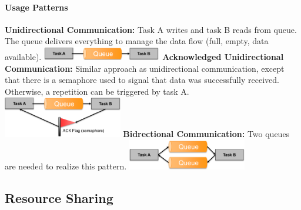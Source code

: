 \paragraph{Usage Patterns}
\begin{paracol}{2}
  \textbf{Unidirectional Communication:} Task A writes and task B reads from queue.
  The queue delivers everything to manage the data flow (full, empty, data available).
  \switchcolumn
  \includegraphics[width=0.39\textwidth]{images/Concurrency/uni_queue.png}
  \switchcolumn
  \textbf{Acknowledged Unidirectional Communication:}
  Similar approach as unidirectional communication, except that there is a semaphore used to signal that data was successfully received.
  Otherwise, a repetition can be triggered by task A.
  \switchcolumn
  \includegraphics[width=0.39\textwidth]{images/Concurrency/ack_queue.png}
  \switchcolumn
  \textbf{Bidrectional Communication:} Two queues are needed to realize this pattern.
  \switchcolumn
  \includegraphics[width=0.39\textwidth]{images/Concurrency/bi_queue.png}
\end{paracol}


\subsection{Resource Sharing}
